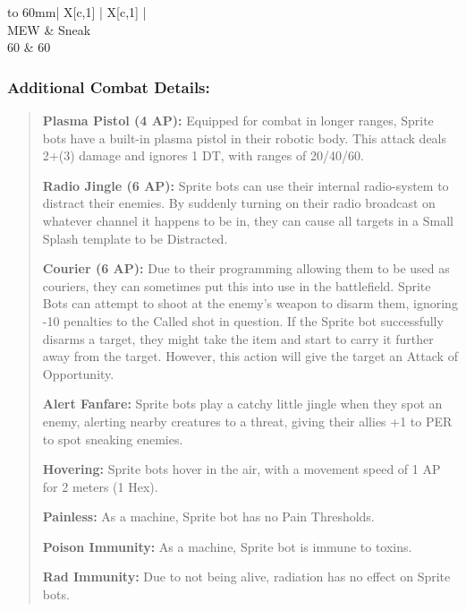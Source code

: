 \documentclass[11pt,a4paper,twocolumn]{book}
\begin{document}
	\bigskip
	{
		\begin{tabu} to 60mm{| X[c,1] | X[c,1] |}
			\hline
			 \\ \hline
			MEW & Sneak                                      \\
			60  & 60                                         \\ \hline
		\end{tabu}
		
	}
	
	\subsubsection*{Additional Combat Details:}
	\begin{verse}
		\textbf{Plasma Pistol (4 AP):} Equipped for combat in longer ranges, Sprite bots have a built-in plasma pistol in their robotic body. This attack deals 2+(3) damage and ignores 1 DT, with ranges of 20/40/60.
		
		\textbf{Radio Jingle (6 AP):} Sprite bots can use their internal radio-system to distract their enemies. By suddenly turning on their radio broadcast on whatever channel it happens to be in, they can cause all targets in a Small Splash template to be Distracted.
		
		\textbf{Courier (6 AP):} Due to their programming allowing them to be used as couriers, they can sometimes put this into use in the battlefield. Sprite Bots can attempt to shoot at the enemy's weapon to disarm them, ignoring -10 penalties to the Called shot in question. If the Sprite bot successfully disarms a target, they might take the item and start to carry it further away from the target. However, this action will give the target an Attack of Opportunity.
		
		\textbf{Alert Fanfare:} Sprite bots play a catchy little jingle when they spot an enemy, alerting nearby creatures to a threat, giving their allies +1 to PER to spot sneaking enemies.
		
		\textbf{Hovering:} Sprite bots hover in the air, with a movement speed of 1 AP for 2 meters (1 Hex).
		
		\textbf{Painless:} As a machine, Sprite bot has no Pain Thresholds.
		
		\textbf{Poison Immunity:} As a machine, Sprite bot is immune to toxins.
		
		\textbf{Rad Immunity:} Due to not being alive, radiation has no effect on Sprite bots.
	\end{verse}
	
\end{document}
